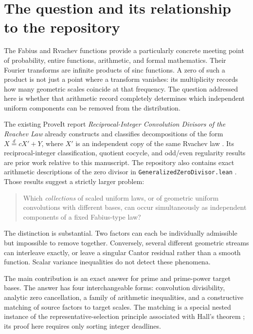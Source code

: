 \documentclass[11pt,a4paper]{article}
\theoremstyle{remark}
\newcommand{\eqd}{\overset{d}{=}}
\newcommand{\pathtext}[1]{\nolinkurl{#1}}
\begin{document}
\clearpage
\tableofcontents
\clearpage

\section{The question and its relationship to the repository}
\label{sec:intro}

The Fabius and Rvachev functions provide a particularly concrete meeting point of
probability, entire functions, arithmetic, and formal mathematics. Their Fourier
transforms are infinite products of sinc functions. A zero of such a product is
not just a point where a transform vanishes: its multiplicity records how many
geometric scales coincide at that frequency. The question addressed here is
whether that arithmetic record completely determines which independent uniform
components can be removed from the distribution.

The existing ProveIt report \emph{Reciprocal-Integer Convolution Divisors of the
Rvachev Law} already constructs and classifies decompositions of the form
$X\eqd cX'+Y$, where $X'$ is an independent copy of the same Rvachev law
\cite{RepoDivisors}. Its reciprocal-integer classification, quotient cocycle, and
odd/even regularity results are prior work relative to this manuscript. The
repository also contains exact arithmetic descriptions of the zero divisor in
\pathtext{GeneralizedZeroDivisor.lean} \cite{RepoLean}. Those results suggest a
strictly larger problem:
\begin{quote}
Which \emph{collections} of scaled uniform laws, or of geometric uniform
convolutions with different bases, can occur simultaneously as independent
components of a fixed Fabius-type law?
\end{quote}
The distinction is substantial. Two factors can each be individually admissible
but impossible to remove together. Conversely, several different geometric
streams can interleave exactly, or leave a singular Cantor residual rather than a
smooth function. Scalar variance inequalities do not detect these phenomena.

The main contribution is an exact answer for prime and prime-power target bases.
The answer has four interchangeable forms: convolution divisibility, analytic
zero cancellation, a family of arithmetic inequalities, and a constructive
matching of source factors to target scales. The matching is a special nested
instance of the representative-selection principle associated with Hall's theorem
\cite{Hall}; its proof here requires only sorting integer deadlines.
\end{document}

